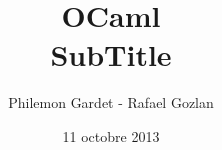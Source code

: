 \documentclass{beamer}
\title{OCaml \\ SubTitle}
\author{Philemon Gardet - Rafael Gozlan}
\institute{\texttt{[image: pics/epita.png]}\\\texttt{[image: pics/gconfs.png]}}
\date{11 octobre 2013}
\begin{document}
	\begin{frame}
		\titlepage
	\end{frame}
	
	\begin{frame}
		\tableofcontents
	\end{frame}

	
	
	
	
	
	
	
	
\end{document}
